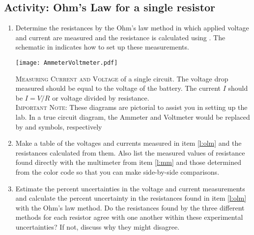\subsection{Activity: Ohm's Law for a single resistor}
\begin{enumerate}
	\item \label{l:olm}Determine the resistances by the Ohm's law method in which applied voltage and current are measured and the resistance is calculated using .  The schematic in  indicates how to set up these measurements.
	
\begin{marginfigure}
	\texttt{[image: AmmeterVoltmeter.pdf]} 
	\caption[Measuring Current and Voltage]{\textsc{Measuring Current and Voltage} of a single circuit.  The voltage drop measured should be equal to the voltage of the battery.  The current $I$ should be $I=V/R$ or voltage divided by resistance.\\[1em]\textsc{Important Note:} These diagrams are pictorial to assist you in setting up the lab.  In a true circuit diagram, the Ammeter and Voltmeter would be replaced by  and  symbols, respectively}
	\label{f:mamblock}
\end{marginfigure}
	
	\item Make a table of the voltages and currents measured in item \ref{l:olm} and the resistances calculated from them.  Also list the measured values of resistance found directly with the multimeter from item \ref{l:mm} and those determined from the color code so that you can make side-by-side comparisons.

	\item Estimate the percent uncertainties in the voltage and current measurements and calculate the percent uncertainty in the resistances found in item \ref{l:olm} with the Ohm's law method.  Do the resistances found by the three different methods for each resistor agree with one another within these experimental uncertainties? If not, discuss why they might disagree.
	
\end{enumerate}


